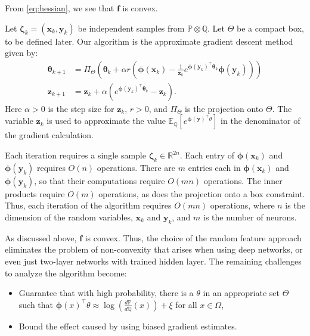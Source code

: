 \documentclass[twoside]{article}
\theoremstyle{definition}
\newcommand{\R}{\mathbb{R}}
\newcommand{\E}{\mathbb{E}}
\newcommand{\Prob}{\mathbb{P}}
\newcommand{\Q}{\mathbb{Q}}
\newcommand{\1}[1]{\scalebox{1.25}{$\mathds{1}$}\left[#1\right]}
\begin{document}
From \eqref{eq:hessian}, we see that $\bm{f}$ is convex. 

Let $\bm{\zeta}_k=(\bm{x}_k,\bm{y}_k)$ be independent samples from $\Prob\otimes \Q$. Let $\Theta$ be a compact box, to be defined later. Our algorithm is the approximate gradient descent method given by:
\begin{subequations}
\label{eq:algorithm}
\begin{align}
\bm{\theta}_{k+1}&=\Pi_{\Theta}\left(\bm{\theta}_k+\alpha r\left(\bm{\phi}(\bm{x}_k)-\frac{1}{\bm{z}_k} e^{\bm{\phi}(\bm{y}_k)^\top \bm{\theta}_k} \bm{\phi}(\bm{y}_k)\right) \right)\\
\bm{z}_{k+1}&=\bm{z}_k+\alpha\left(e^{\bm{\phi}(\bm{y}_k)^\top \bm{\theta}_k} -\bm{z}_k\right).
\end{align}
\end{subequations}
Here $\alpha>0$ is the step size for $\bm{z}_k$, $r>0$, and $\Pi_{\Theta}$ is the projection onto $\Theta$. 
The variable $\bm{z}_k$ is used to approximate the value $\E_{\Q}[e^{\bm{\phi}(\bm{y})^\top \theta}]$  in the denominator of the gradient calculation. 

Each iteration requires a single sample $\bm{\zeta}_k\in\R^{2n}$. Each entry of $\bm{\phi}(\bm{x}_k)$ and $\bm{\phi}(\bm{y}_k)$ requires $O(n)$ operations. There are $m$ entries each in $\bm{\phi}(\bm{x}_k)$ and $\bm{\phi}(\bm{y}_k)$, so that their computations require $O(mn)$ operations. The inner products require $O(m)$ operations, as  does the projection onto a box constraint. Thus, each iteration of the algorithm requires $O(mn)$ operations, where $n$ is the dimension of the random variables, $\bm{x}_k$ and $\bm{y}_k$, and $m$ is the number of neurons. 


As discussed above, $\bm{f}$ is convex. Thus,
the choice of the random feature approach eliminates the problem of non-convexity that arises when using deep networks, or even just two-layer networks with trained hidden layer. The remaining challenges to analyze the algorithm become:
\begin{itemize}
\item Guarantee that with high probability, there is a $\theta$ in an appropriate set $\Theta$ such that $\bm{\phi}(x)^\top \theta \approx \log\left(\frac{d\Prob}{d\Q}(x) \right)+\xi$ for all $x\in\Omega$,
\item Bound the effect caused by using biased  gradient estimates.
\end{itemize}
\end{document}
